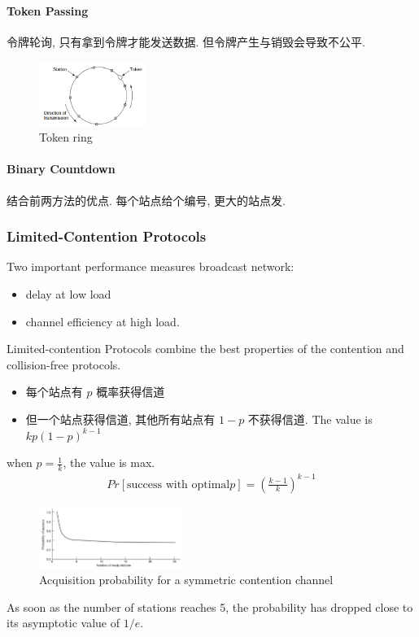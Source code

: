 \paragraph{Token Passing}令牌轮询, 只有拿到令牌才能发送数据. 但令牌产生与销毁会导致不公平. 
\begin{figure}[!htb]
    \centering
    \includegraphics[width=0.309\textwidth]{pic/CN4/Token ring}
    \caption{Token ring}
\end{figure}

\paragraph{Binary Countdown}结合前两方法的优点. 每个站点给个编号, 更大的站点发. 

\subsubsection{Limited-Contention Protocols}
Two important performance measures broadcast network:
\begin{itemize}
    \item delay at low load
    \item channel efficiency at high load.
\end{itemize}


Limited-contention Protocols combine the best properties of the contention and collision-free protocols.
\begin{itemize}
    \item 每个站点有 $p$ 概率获得信道
    \item 但一个站点获得信道, 其他所有站点有 $1-p$ 不获得信道. The value is $kp(1-p)^{k-1}$
\end{itemize}
when $p=\frac{1}{k}$, the value is max. 
\begin{align*}
    Pr[\text{success with optimal} p]=\left( \frac{k-1}{k} \right)^{k-1}
\end{align*}

\begin{figure}[!htb]
    \centering
    \includegraphics[width=0.42\textwidth]{pic/CN4/Acquisition probability for a symmetric contention channel}
    \caption{Acquisition probability for a symmetric contention channel}
\end{figure}
As soon as the number of stations reaches 5, the probability has dropped close to its asymptotic value of $1/e$.


